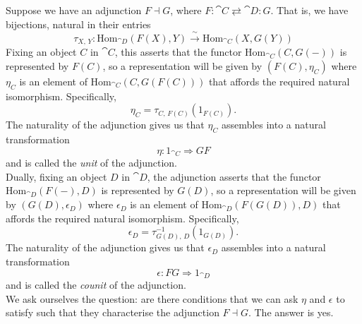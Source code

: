 \vspace*{1em}

\begin{discussion}\label{unit-counit}
Suppose we have an adjunction $F \dashv G$, where $F:\cat{C} \rightleftarrows \cat{D}:G$. That is, we have bijections, natural in their entries
\[\tau_{X,\,Y}: \mathrm{Hom}_{\cat{D}}(F(X),Y) \overset{\!\!\sim}{\to} \mathrm{Hom}_{\cat{C}}(X,G(Y))\]
Fixing an object $C$ in $\cat{C}$, this asserts that the functor $\mathrm{Hom}_{\cat{C}}(C,G(-))$ is represented by $F(C)$, so a representation will be given by $(F(C),\eta_C)$ where $\eta_C$ is an element of $\mathrm{Hom}_{\cat{C}}(C,G(F(C)))$ that affords the required natural isomorphism. Specifically, \[\eta_C = \tau_{C,\,F(C)}(1_{F(C)}).\]
The naturality of the adjunction gives us that $\eta_C$ assembles into a natural transformation
\[\eta:1_{\cat{C}} \Rightarrow GF\]
and is called the \emph{unit} of the adjunction.\\[1em]
Dually, fixing an object $D$ in $\cat{D}$, the adjunction asserts that the functor $\mathrm{Hom}_{\cat{D}}(F(-),D)$ is represented by $G(D)$, so a representation will be given by $(G(D),\epsilon_D)$ where $\epsilon_D$ is an element of $\mathrm{Hom}_{\cat{D}}(F(G(D)),D)$ that affords the required natural isomorphism. Specifically, \[\epsilon_D = \tau^{-1}_{G(D),\,D}(1_{G(D)}).\]
The naturality of the adjunction gives us that $\epsilon_D$ assembles into a natural transformation
\[\epsilon:FG \Rightarrow 1_{\cat{D}}\]
and is called the \emph{counit} of the adjunction.\\[1em]
We ask ourselves the question: are there conditions that we can ask $\eta$ and $\epsilon$ to satisfy such that they characterise the adjunction $F\dashv G$. The answer is yes. 
\end{discussion}

\vspace*{0.1in}

